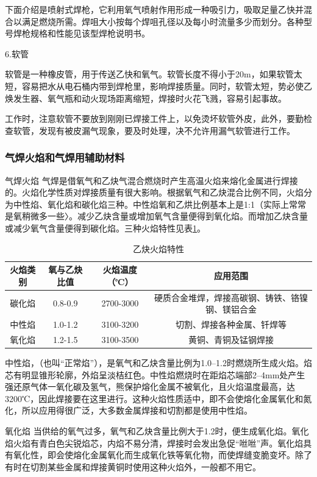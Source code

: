 \documentclass{ctexbook}
\begin{document}
下面介绍是喷射式焊枪，它利用氧气喷射作用形成一种吸引力，吸取足量乙快并混合以满足燃烧所需。焊咀大小按每个焊咀孔径以及每小时流量多少而划分。各种型号焊枪规格和性能见该型焊枪说明书。

6.软管

软管是一种橡皮管，用于传送乙快和氧气。软管长度不得小于20m，如果软管太短，容易把水从电石桶内带到焊枪里，影响焊接质量。同时，软管太短，势必使乙焕发生器、氧气瓶和动火现场距离缩短，焊接时火花飞溅，容易引起事故。

工作时，注意软管不要放到刚刚已焊接工件上，以免烫坏软管外皮，此外，要勤检查软管，发现有被皮漏气现象，要及时处理，决不允许用漏气软管进行工作。
\subsubsection{气焊火焰和气焊用辅助材料}
气焊火焰
气焊是借氧气和乙炔气混合燃烧时产生高温火焰来熔化金属进行焊接的。火焰化学性质对焊接质量有很大影响。根据氧气和乙炔混合比例不同，火焰分为中性焰、氧化焰和碳化焰三种。中性焰氧和乙烘比例基本上是1:1（实际上常常是氧稍微多一些〉。减少乙炔含量或增加氧气含量便得到氧化焰。而增加乙炔含量或减少氧气含量便得到碳化焰。三种火焰特性见表\ref{tab:yiquehuoyan}。
\begin{table}[htbp]
	\centering
	\caption{乙炔火焰特性}
	\begin{tabular}{c|c|c|c}
		\hline
		火焰类别  & 氧与乙炔比值 &  火焰温度（℃） & 应用范围 \\ \hline
		碳化焰   & 0.8-0.9 & 2700-3000 & 硬质合金堆焊，焊接高碳钢、铸铁、铬镍钢、镁铝合金 \\ \hline
		中性焰   & 1.0-1.2 & 3100-3200 & 切割、焊接各种金属、钎焊等 \\ \hline
		氧化焰   & 1.2-1.5 & 3100-3500 & 黄铜、青铜及锰钢焊接 \\ \hline
	\end{tabular}%
	\label{tab:yiquehuoyan}%
\end{table}%
中性焰，（也叫“正常焰”），是氧气和乙炔含量比例为1.0--1.2时燃烧所生成火焰。焰芯有明显锥形轮廓，外焰呈淡桔红色。中性焰燃烧时在距焰芯端部2--4mm处产生强还原气体一氧化碳及氢气，熊保护熔化金属不被氧化，且火焰温度最高，达3200℃，因此焊接要在这里进行。这种火焰性质适中，即不会使熔化金属氧化和氮化，所以应用得很广泛，大多数金属焊接和切割都是使用中性焰。

氧化焰 当供给的氧气过多，氧气和乙炔含量比例大于1.2时，便生成氧化焰。氧化焰火焰有青白色尖锐焰芯，内焰不易分清，焊接时会发出急促“咝咝”声。氧化焰具有氧化性，即会使熔化金属氧化而生成氧化铁等氧化物，而使焊缝变脆变坏。除了有时在切割某些金属和焊接黄铜时使用这种火焰外，一般都不用它。
\end{document}
